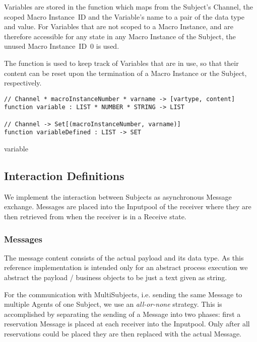 Variables are stored in the  function which maps from
the Subject's Channel, the scoped Macro Instance~ID and the Variable's name to
a pair of the data type and value. For Variables that are not scoped to a Macro
Instance, and are therefore accessible for any state in any Macro Instance of
the Subject, the unused Macro Instance~ID~0 is used.

The function  is used to keep track of Variables
that are in use, so that their content can be reset upon the termination of a
Macro Instance or the Subject, respectively.


\begin{listing}[H]
\begin{verbatim}
// Channel * macroInstanceNumber * varname -> [vartype, content]
function variable : LIST * NUMBER * STRING -> LIST

// Channel -> Set[(macroInstanceNumber, varname)]
function variableDefined : LIST -> SET
\end{verbatim}
\caption{variable}
\label{lst:shortasm:variable}
\end{listing}




\subsection{Interaction Definitions}\label{sec:InteractionDefinitions}

We implement the interaction between Subjects as asynchronous Message exchange.
Messages are placed into the Inputpool of the receiver where they are then retrieved from when the receiver is in a Receive state.


\subsubsection{Messages}\label{sec:messages}

The message content consists of the actual payload and its data type. As this
reference implementation is intended only for an abstract process execution we abstract
the payload / business objects to be just a text given as string.

For the communication with MultiSubjects, i.e. sending the same Message to
multiple Agents of one Subject, we use an \textit{all-or-none} strategy. This
is accomplished by separating the sending of a Message into two phases: first
a reservation Message is placed at each receiver into the Inputpool.
Only after all reservations could be placed they are then replaced with the
actual Message.

